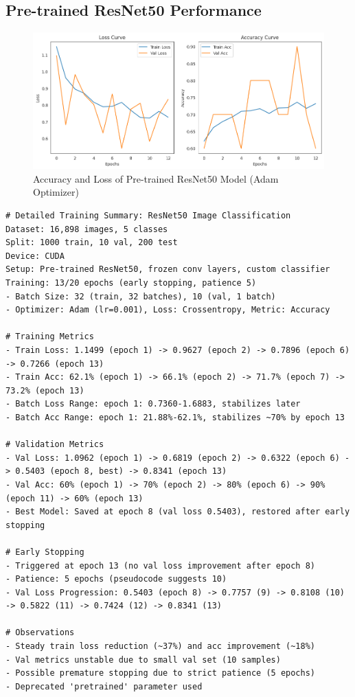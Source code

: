 \documentclass[a4paper,12pt]{article}
\begin{document}
\subsection*{Pre-trained ResNet50 Performance}
\begin{figure}[H]
    \centering
    \includegraphics[width=1.0\textwidth]{assets/cassava/resnet_50.png}
    \caption{Accuracy and Loss of Pre-trained ResNet50 Model (Adam Optimizer)}
\end{figure}
\clearpage
\begin{lstlisting}
# Detailed Training Summary: ResNet50 Image Classification
Dataset: 16,898 images, 5 classes
Split: 1000 train, 10 val, 200 test
Device: CUDA
Setup: Pre-trained ResNet50, frozen conv layers, custom classifier
Training: 13/20 epochs (early stopping, patience 5)
- Batch Size: 32 (train, 32 batches), 10 (val, 1 batch)
- Optimizer: Adam (lr=0.001), Loss: Crossentropy, Metric: Accuracy

# Training Metrics
- Train Loss: 1.1499 (epoch 1) -> 0.9627 (epoch 2) -> 0.7896 (epoch 6) -> 0.7266 (epoch 13)
- Train Acc: 62.1% (epoch 1) -> 66.1% (epoch 2) -> 71.7% (epoch 7) -> 73.2% (epoch 13)
- Batch Loss Range: epoch 1: 0.7360-1.6883, stabilizes later
- Batch Acc Range: epoch 1: 21.88%-62.1%, stabilizes ~70% by epoch 13

# Validation Metrics
- Val Loss: 1.0962 (epoch 1) -> 0.6819 (epoch 2) -> 0.6322 (epoch 6) -> 0.5403 (epoch 8, best) -> 0.8341 (epoch 13)
- Val Acc: 60% (epoch 1) -> 70% (epoch 2) -> 80% (epoch 6) -> 90% (epoch 11) -> 60% (epoch 13)
- Best Model: Saved at epoch 8 (val loss 0.5403), restored after early stopping

# Early Stopping
- Triggered at epoch 13 (no val loss improvement after epoch 8)
- Patience: 5 epochs (pseudocode suggests 10)
- Val Loss Progression: 0.5403 (epoch 8) -> 0.7757 (9) -> 0.8108 (10) -> 0.5822 (11) -> 0.7424 (12) -> 0.8341 (13)

# Observations
- Steady train loss reduction (~37%) and acc improvement (~18%)
- Val metrics unstable due to small val set (10 samples)
- Possible premature stopping due to strict patience (5 epochs)
- Deprecated 'pretrained' parameter used
\end{lstlisting}
\clearpage
\end{document}
